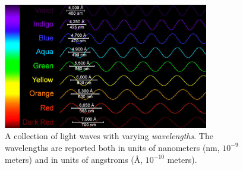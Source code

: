 \documentclass[11pt]{article}
\begin{document}
\begin{figure}[t!]
    \centering
    \includegraphics[width=0.8\textwidth]{Figures/optical.png}
    \caption{A collection of light waves with varying \emph{wavelengths}. The wavelengths are reported both in units of nanometers (nm, $10^{-9}$ meters) and in units of angstroms (\AA, $10^{-10}$ meters).}
    \label{fig:lightwaves}
\end{figure}
\end{document}

